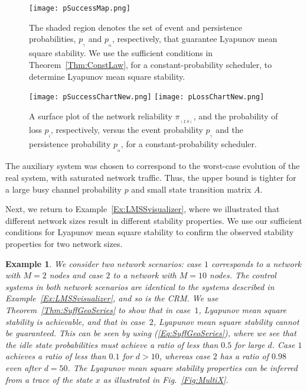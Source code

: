 \documentclass[twocolumn]{autart}
\newtheorem{example}{Example}[section]
\begin{document}
\begin{figure*}[ptb]
\centering
\texttt{[image: pSuccessMap.png]}
\caption{The shaded region denotes the set of event and persistence probabilities, $p_{_{\gamma}}$ and $p_{_{\alpha}}$, respectively, that guarantee Lyapunov mean square stability. We use the sufficient conditions in Theorem~\ref{Thm:ConstLaw}, for a constant-probability scheduler, to determine Lyapunov mean square stability. }
\label{Fig:pSuccessMap}
\end{figure*}
\begin{figure*}[ptb]
\texttt{[image: pSuccessChartNew.png]} \hfill
\texttt{[image: pLossChartNew.png]}
\caption{A surface plot of the network reliability $\pi_{_{(I,0)}}$, and the probability of loss $p_{_{l}}$, respectively, versus the event probability $p_{_{\gamma}}$ and the persistence probability $p_{_{\alpha}}$, for a constant-probability scheduler. }
\label{Fig:pSuccessLossPlot}\end{figure*}

The auxiliary system was chosen to correspond to the worst-case evolution of the real system, with saturated network traffic. Thus, the upper bound is tighter for a large busy channel probability $p$ and small state transition matrix $A$.


Next, we return to Example~\ref{Ex:LMSSvisualizer}, where we illustrated that different network sizes result in different stability properties. We use our sufficient conditions for Lyapunov mean square stability to confirm the observed stability properties for two network sizes.
\begin{example}\textbf{} \label{Ex:LMSSver}
We consider two network scenarios: case $1$ corresponds to a network with $M = 2$ nodes and case $2$ to a network with $M=10$ nodes. The control systems in both network scenarios are identical to the systems described in Example~\ref{Ex:LMSSvisualizer}, and so is the CRM. We use Theorem~\ref{Thm:SuffGeoSeries} to show that in case~$1$, Lyapunov mean square stability is achievable, and that in case~$2$, Lyapunov mean square stability cannot be guaranteed. This can be seen by using (\ref{Eq:SuffGeoSeries}), where we see that the idle state probabilities must achieve a ratio of less than $0.5$ for large $d$. Case $1$ achieves a ratio of less than $0.1$ for $d>10$, whereas case $2$ has a ratio of $0.98$ even after $d=50$. The Lyapunov mean square stability properties can be inferred from a trace of the state $x$ as illustrated in Fig.~\ref{Fig:MultiX}.
\end{example}
\end{document}
